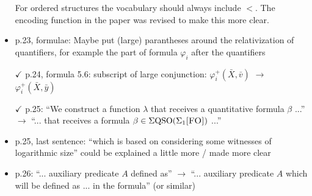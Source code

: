 \documentclass[a4paper]{article}
\begin{document}
\begin{itemize}
	For ordered structures the vocabulary should always include $<$. The encoding function in the paper was revised to make this more clear.
	
	\item p.23, formulae: Maybe put (large) parantheses around the relativization of quantifiers, for	example the part of formula $\varphi_i$ after the quantifiers
	\item[$\checkmark$] p.24, formula 5.6: subscript of large conjunction: $\varphi_i^{+}(\bar{X},\bar{v})$ $\to$ $\varphi_i^{+}(\bar{X},\bar{y})$
	\item[$\checkmark$] p.25: ``We construct a function $\lambda$ that receives a quantitative formula $\beta$ ...'' $\to$ ``... that receives
	a formula $\beta \in \Sigma{\rm QSO}(\Sigma_{1}\textsc{[FO]})$ ...''
	\item p.25, last sentence: ``which is based on considering some witnesses of logarithmic size'' could
	be explained a little more / made more clear
	\item p.26: ``... auxiliary predicate $A$ defined as'' $\to$ ``... auxiliary predicate $A$ which will be defined
	as ... in the formula'' (or similar)

\end{itemize}
\end{document}
